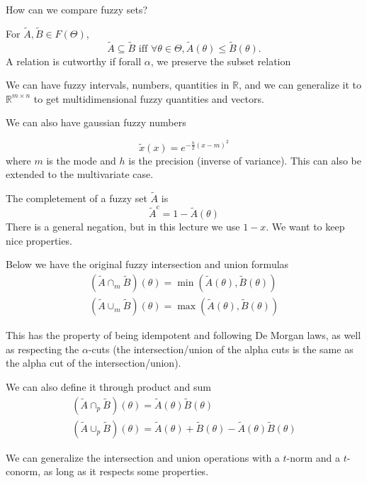 \documentclass[11pt]{article}
\begin{document}
How can we compare fuzzy sets?

For $\tilde{A}, \tilde{B} \in F(\Theta)$, 
\begin{equation}
    \tilde{A} \subseteq \tilde{B} \text{ iff } \forall \theta \in \Theta, \tilde{A}(\theta) \leq \tilde{B}(\theta).
\end{equation}
A relation is cutworthy if forall $\alpha$, we preserve the subset relation

We can have fuzzy intervals, numbers, quantities in $\mathbb{R}$, and we can generalize it to $\mathbb{R}^{m \times n}$ to get multidimensional fuzzy quantities and vectors.

We can also have gaussian fuzzy numbers

\begin{equation}
    \tilde{x}(x) = e^{-\frac{h}{2}(x-m)^2}
\end{equation}
where $m$ is the mode and $h$ is the precision (inverse of variance).
This can also be extended to the multivariate case.

The completement of a fuzzy set $\tilde{A}$ is
\begin{equation}
    \tilde{A}^c = 1 - \tilde{A}(\theta)
\end{equation}
There is a general negation, but in this lecture we use $1-x$.
We want to keep nice properties.

Below we have the original fuzzy intersection and union formulas
\begin{gather}
    (\tilde{A} \cap_m \tilde{B})(\theta) = \min(\tilde{A}(\theta), \tilde{B}(\theta)) \\
   (\tilde{A} \cup_m \tilde{B})(\theta) = \max(\tilde{A}(\theta), \tilde{B}(\theta)) 
\end{gather}

This has the property of being idempotent and following De Morgan laws, as well as respecting the $\alpha$-cuts (the intersection/union of the alpha cuts is the same as the alpha cut of the intersection/union).

We can also define it through product and sum
\begin{gather}
    (\tilde{A} \cap_p \tilde{B})(\theta) = \tilde{A}(\theta) \tilde{B}(\theta) \\
   (\tilde{A} \cup_p \tilde{B})(\theta) = \tilde{A}(\theta)  + \tilde{B}(\theta) - \tilde{A}(\theta) \tilde{B}(\theta)
\end{gather}

We can generalize the intersection and union operations with a $t$-norm and a $t$-conorm, as long as it respects some properties.
\end{document}
